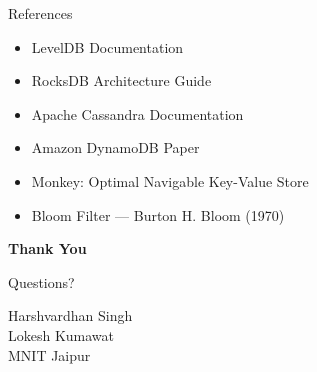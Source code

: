 \documentclass[11pt]{beamer}
\begin{document}
\begin{frame}{References}

\small

\begin{itemize}
    \item LevelDB Documentation
    \item RocksDB Architecture Guide
    \item Apache Cassandra Documentation
    \item Amazon DynamoDB Paper
    \item Monkey: Optimal Navigable Key-Value Store
    \item Bloom Filter — Burton H. Bloom (1970)
\end{itemize}

\end{frame}

\begin{frame}[plain]

\begin{center}

\vspace{2cm}

{\Huge \textbf{Thank You}}

\vspace{1cm}

{\Large Questions?}

\vfill

{\footnotesize
Harshvardhan Singh \\
Lokesh Kumawat \\
MNIT Jaipur
}

\end{center}

\end{frame}

\end{document}
